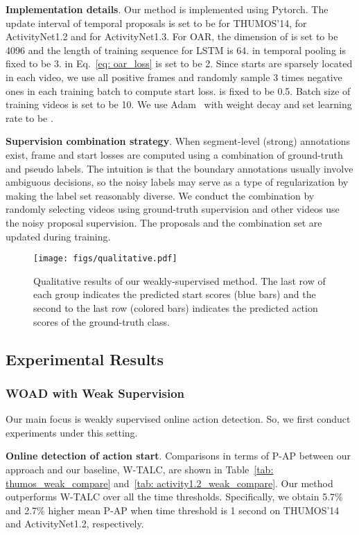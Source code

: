 \documentclass[final]{cvpr}
\begin{document}
\textbf{Implementation details}. Our method is implemented using Pytorch. The update interval of temporal proposals is set to be  for THUMOS'14,  for ActivityNet1.2 and  for ActivityNet1.3. For OAR, the dimension of  is set to be 4096 and the length of training sequence for LSTM is 64.  in temporal pooling is fixed to be 3.  in Eq.~\ref{eq: oar_loss} is set to be 2. Since starts are sparsely located in each video, we use all positive frames and randomly sample 3 times negative ones in each training batch to compute start loss.  is fixed to be 0.5. Batch size of training videos is set to be 10. We use Adam~\cite{kingma2014adam} with weight decay  and set learning rate to be . 

\textbf{Supervision combination strategy}. When segment-level (strong) annotations exist, frame and start losses are computed using a combination of ground-truth and pseudo labels. The intuition is that the boundary annotations usually involve ambiguous decisions, so the noisy labels may serve as a type of regularization by making the label set reasonably diverse. We conduct the combination by randomly selecting  videos using ground-truth supervision and other videos use the noisy proposal supervision. The proposals and the combination set are updated during training.

\begin{figure*}[t]
    \centering
    \texttt{[image: figs/qualitative.pdf]}
    \caption{Qualitative results of our weakly-supervised method. The last row of each group indicates the predicted start scores (blue bars) and the second to the last row (colored bars) indicates the predicted action scores of the ground-truth class.
    }
    \label{fig: qualitative}
\end{figure*}

\subsection{Experimental Results}
\subsubsection{WOAD with Weak Supervision}
Our main focus is weakly supervised online action detection. So, we first conduct experiments under this setting.

\textbf{Online detection of action start}. Comparisons in terms of P-AP between our approach and our baseline, W-TALC, are shown in Table~\ref{tab: thumos_weak_compare} and~\ref{tab: activity1.2_weak_compare}. Our method outperforms W-TALC over all the time thresholds. Specifically, we obtain 5.7\% and 2.7\% higher mean P-AP when time threshold is 1 second on THUMOS'14 and ActivityNet1.2, respectively. 
\end{document}
